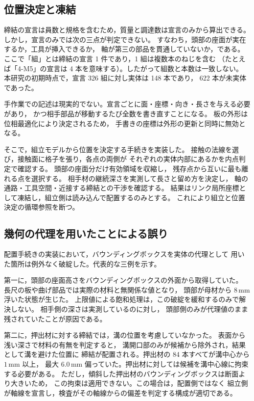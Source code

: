 \documentclass[a4paper,10pt,twocolumn]{ltjsarticle}
\newcommand{\mm}{\ensuremath{\,\mathrm{mm}}}
\begin{document}
\subsection{位置決定と凍結}

締結の宣言は員数と規格を含むため，質量と調達数は宣言のみから算出できる。
しかし，宣言のみでは次の三点が判定できない。
すなわち，頭部の座面が実在するか，工具が挿入できるか，
軸が第三の部品を貫通していないか，である。
ここで「組」とは締結の宣言 1 件であり，1 組は複数本のねじを含む
（たとえば「4-M5」の宣言は 4 本を意味する）。したがって組数と本数は一致しない。
本研究の初期時点で，宣言 326 組に対し実体は 148 本であり，
622 本が未実体であった。

手作業での記述は現実的でない。宣言ごとに面・座標・向き・長さを与える必要があり，
かつ相手部品が移動するたび全数を書き直すことになる。
板の外形は位相最適化により決定されるため，
手書きの座標は外形の更新と同時に無効となる。

そこで，組立モデルから位置を決定する手続きを実装した。
接触の法線を選び，接触面に格子を張り，各点の両側が
それぞれの実体内部にあるかを内点判定で確認する。
頭部の座面分だけ有効領域を収縮し，
残存点から互いに最も離れる点を選択する。
相手材の継続深さを実測して長さと留め方を決定し，
軸の通路・工具空間・近接する締結との干渉を確認する。
結果はリンク局所座標として凍結し，組立側は読み込んで配置するのみとする。
これにより組立と位置決定の循環参照を断つ。

\subsection{幾何の代理を用いたことによる誤り}

配置手続きの実装において，バウンディングボックスを実体の代理として
用いた箇所は例外なく破綻した。代表的な三例を示す。

第一に，頭部の座面高さをバウンディングボックスの外面から取得していた。
長尺の板や曲げ部品では実際の材料と無関係な値となり，
頭部が母材から $8\mm$ 浮いた状態が生じた。
上限値による飽和処理は，この破綻を緩和するのみで解決しない。
相手側の深さは実測しているのに対し，
頭部側のみが代理値のまま残されていたことが原因である。

第二に，押出材に対する締結では，溝の位置を考慮していなかった。
表面から浅い深さで材料の有無を判定すると，
溝開口部のみが候補から除外され，結果として溝を避けた位置に
締結が配置される。押出材の 84 本すべてが溝中心から $1\mm$ 以上，
最大 $6.0\mm$ 偏っていた。押出材に対しては候補を溝中心線に拘束する必要がある。
ただし，傾斜した押出材のバウンディングボックスは断面より大きいため，
この拘束は適用できない。この場合は，配置側ではなく
組立側が軸線を宣言し，検査がその軸線からの偏差を判定する構成が適切である。
\end{document}
